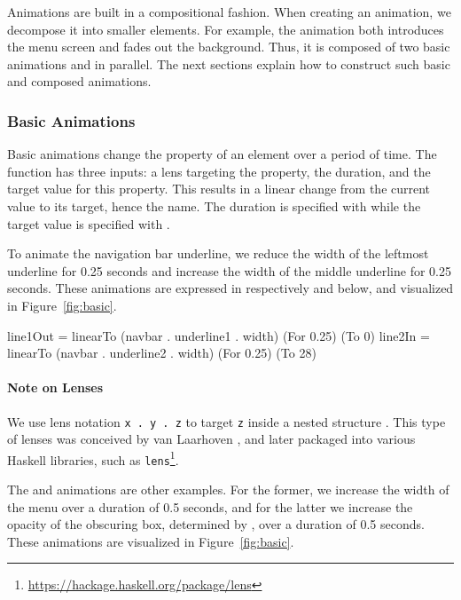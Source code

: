 Animations are built in a compositional fashion. When creating an animation, we decompose it into smaller elements. For example, the  animation both introduces the menu screen and fades out the background. Thus, it is composed of two basic animations  and  in parallel. The next sections explain how to construct such basic and composed animations.

\subsubsection{Basic Animations}

Basic animations change the property of an element over a period of time.
The  function has three inputs: a lens targeting the property, the duration,
and the target value for this property. This results in a linear change from
the current value to its target, hence the name. The duration is specified
with  while the target value is specified with .

To animate the navigation bar underline, we reduce the width of the
leftmost underline for 0.25 seconds and increase the width of
the middle underline for 0.25 seconds. These animations are expressed in
respectively  and  below, and visualized in
Figure~\ref{fig:basic}.

\begin{spec}
line1Out = linearTo (navbar . underline1 . width) (For 0.25) (To 0)
line2In = linearTo (navbar . underline2 . width) (For 0.25) (To 28)
\end{spec}

\paragraph{Note on Lenses} We use lens notation \texttt{x . y . z} to
target \texttt{z} inside a nested structure . This type of lenses was conceived by van Laarhoven
\cite{vlLenses}, and later packaged into
various Haskell libraries, such as
\texttt{lens}\footnote{\url{https://hackage.haskell.org/package/lens}}.

The  and  animations are other examples. For the
former, we increase the width of the menu over a duration of 0.5 seconds, and
for the latter we increase the opacity of the obscuring box, determined by , over a duration
of 0.5 seconds. These animations are visualized in Figure~\ref{fig:basic}.

